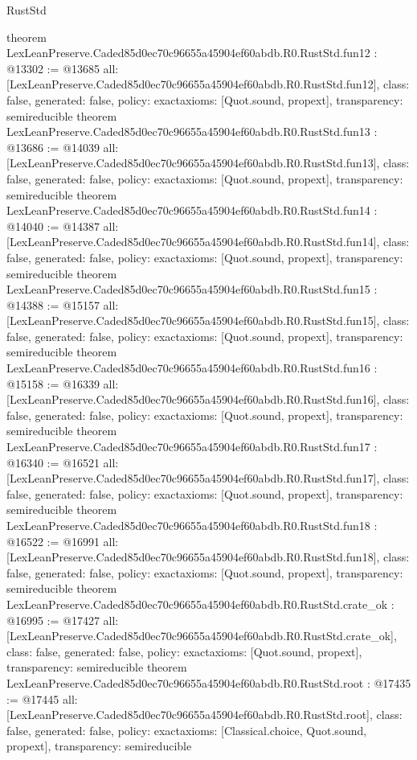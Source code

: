 \begin{lexlean}{RustStd}
\begin{coremodule}
{}
theorem LexLeanPreserve.Caded85d0ec70c96655a45904ef60abdb.R0.RustStd.fun12 : @13302 := @13685 {
  all: [LexLeanPreserve.Caded85d0ec70c96655a45904ef60abdb.R0.RustStd.fun12],
  class: false,
  generated: false,
  policy: exact{axioms: [Quot.sound, propext]},
  transparency: semireducible
}
theorem LexLeanPreserve.Caded85d0ec70c96655a45904ef60abdb.R0.RustStd.fun13 : @13686 := @14039 {
  all: [LexLeanPreserve.Caded85d0ec70c96655a45904ef60abdb.R0.RustStd.fun13],
  class: false,
  generated: false,
  policy: exact{axioms: [Quot.sound, propext]},
  transparency: semireducible
}
theorem LexLeanPreserve.Caded85d0ec70c96655a45904ef60abdb.R0.RustStd.fun14 : @14040 := @14387 {
  all: [LexLeanPreserve.Caded85d0ec70c96655a45904ef60abdb.R0.RustStd.fun14],
  class: false,
  generated: false,
  policy: exact{axioms: [Quot.sound, propext]},
  transparency: semireducible
}
theorem LexLeanPreserve.Caded85d0ec70c96655a45904ef60abdb.R0.RustStd.fun15 : @14388 := @15157 {
  all: [LexLeanPreserve.Caded85d0ec70c96655a45904ef60abdb.R0.RustStd.fun15],
  class: false,
  generated: false,
  policy: exact{axioms: [Quot.sound, propext]},
  transparency: semireducible
}
theorem LexLeanPreserve.Caded85d0ec70c96655a45904ef60abdb.R0.RustStd.fun16 : @15158 := @16339 {
  all: [LexLeanPreserve.Caded85d0ec70c96655a45904ef60abdb.R0.RustStd.fun16],
  class: false,
  generated: false,
  policy: exact{axioms: [Quot.sound, propext]},
  transparency: semireducible
}
theorem LexLeanPreserve.Caded85d0ec70c96655a45904ef60abdb.R0.RustStd.fun17 : @16340 := @16521 {
  all: [LexLeanPreserve.Caded85d0ec70c96655a45904ef60abdb.R0.RustStd.fun17],
  class: false,
  generated: false,
  policy: exact{axioms: [Quot.sound, propext]},
  transparency: semireducible
}
theorem LexLeanPreserve.Caded85d0ec70c96655a45904ef60abdb.R0.RustStd.fun18 : @16522 := @16991 {
  all: [LexLeanPreserve.Caded85d0ec70c96655a45904ef60abdb.R0.RustStd.fun18],
  class: false,
  generated: false,
  policy: exact{axioms: [Quot.sound, propext]},
  transparency: semireducible
}
theorem LexLeanPreserve.Caded85d0ec70c96655a45904ef60abdb.R0.RustStd.crate_ok : @16995 := @17427 {
  all: [LexLeanPreserve.Caded85d0ec70c96655a45904ef60abdb.R0.RustStd.crate_ok],
  class: false,
  generated: false,
  policy: exact{axioms: [Quot.sound, propext]},
  transparency: semireducible
}
theorem LexLeanPreserve.Caded85d0ec70c96655a45904ef60abdb.R0.RustStd.root : @17435 := @17445 {
  all: [LexLeanPreserve.Caded85d0ec70c96655a45904ef60abdb.R0.RustStd.root],
  class: false,
  generated: false,
  policy: exact{axioms: [Classical.choice, Quot.sound, propext]},
  transparency: semireducible
}


\end{coremodule}
\end{lexlean}
